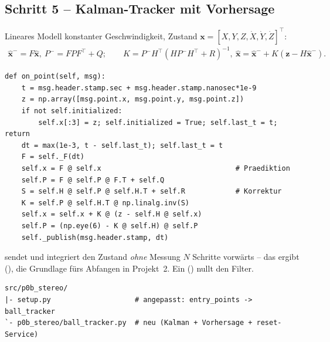 \subsection{Schritt 5 -- Kalman-Tracker mit Vorhersage}
Lineares Modell konstanter Geschwindigkeit, Zustand
$\mathbf{x}=[X,Y,Z,\dot X,\dot Y,\dot Z]^\top$:
\begin{align*}
\hat{\mathbf{x}}^- = F\hat{\mathbf{x}},\ P^-=FPF^\top+Q;\qquad
K=P^-H^\top(HP^-H^\top+R)^{-1},\ \hat{\mathbf{x}}=\hat{\mathbf{x}}^-+K(\mathbf z-H\hat{\mathbf x}^-).
\end{align*}
\begin{lstlisting}[style=py,caption={\code{p0b\_stereo/ball\_tracker.py} (Kern)}]
def on_point(self, msg):
    t = msg.header.stamp.sec + msg.header.stamp.nanosec*1e-9
    z = np.array([msg.point.x, msg.point.y, msg.point.z])
    if not self.initialized:
        self.x[:3] = z; self.initialized = True; self.last_t = t; return
    dt = max(1e-3, t - self.last_t); self.last_t = t
    F = self._F(dt)
    self.x = F @ self.x                                # Praediktion
    self.P = F @ self.P @ F.T + self.Q
    S = self.H @ self.P @ self.H.T + self.R            # Korrektur
    K = self.P @ self.H.T @ np.linalg.inv(S)
    self.x = self.x + K @ (z - self.H @ self.x)
    self.P = (np.eye(6) - K @ self.H) @ self.P
    self._publish(msg.header.stamp, dt)
\end{lstlisting}
\noindent {} sendet  und integriert den
Zustand \emph{ohne} Messung $N$ Schritte vorwärts -- das ergibt
 (), die Grundlage fürs Abfangen in
Projekt~2. Ein  () nullt den Filter.
\begin{lstlisting}[style=bash,caption={\code{ros2\_ws}-Delta nach Schritt 5 (\# neu / \# angepasst)}]
src/p0b_stereo/
|- setup.py                    # angepasst: entry_points -> ball_tracker
`- p0b_stereo/ball_tracker.py  # neu (Kalman + Vorhersage + reset-Service)
\end{lstlisting}

